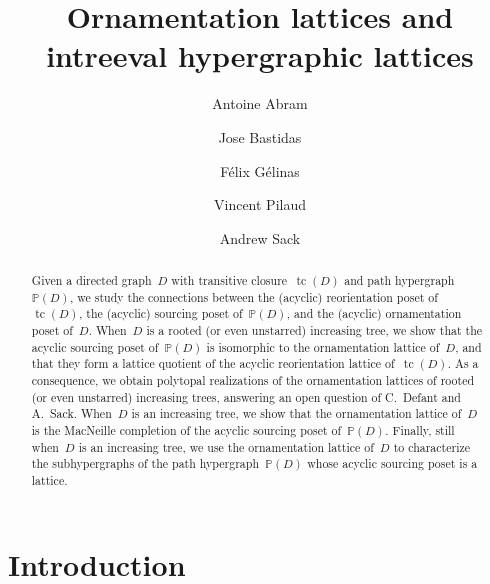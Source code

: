 \documentclass{amsart}
\title[Ornamentation lattices and intreeval hypergraphic lattices]{Ornamentation lattices and \\ intreeval hypergraphic lattices}
\author{Antoine Abram}
\author{Jose Bastidas}
\author{F\'elix G\'elinas}
\author{Vincent Pilaud}
\author{Andrew Sack}
\theoremstyle{definition}
\DeclareMathOperator{\tc}{tc} %
\newcommand{\PP}{\mathbb P} %
\begin{document}
\begin{abstract}
Given a directed graph~$D$ with transitive closure~$\tc(D)$ and path hypergraph~$\PP(D)$, we study the connections between the (acyclic) reorientation poset of~$\tc(D)$, the (acyclic) sourcing poset of~$\PP(D)$, and the (acyclic) ornamentation poset of~$D$.
When~$D$ is a rooted (or even unstarred) increasing tree, we show that the acyclic sourcing poset of~$\PP(D)$ is isomorphic to the ornamentation lattice of~$D$, and that they form a lattice quotient of the acyclic reorientation lattice of~$\tc(D)$.
As a consequence, we obtain polytopal realizations of the ornamentation lattices of rooted (or even unstarred) increasing trees, answering an open question of C.~Defant and A.~Sack.
When~$D$ is an increasing tree, we show that the ornamentation lattice of~$D$ is the MacNeille completion of the acyclic sourcing poset of~$\PP(D)$.
Finally, still when~$D$ is an increasing tree, we use the ornamentation lattice of~$D$ to characterize the subhypergraphs of the path hypergraph~$\PP(D)$ whose acyclic sourcing poset is a lattice.
\end{abstract}

\vspace*{-1cm}
\maketitle

\tableofcontents


\pagebreak

\section{Introduction}
\label{sec:introduction}


\end{document}
